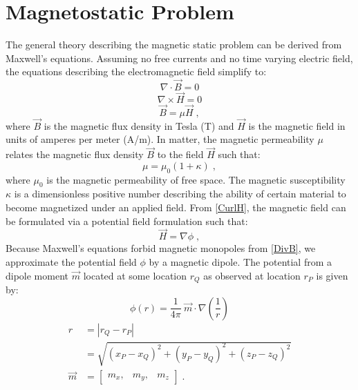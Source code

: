 
\chapter{Magnetostatic Problem}
\label{ch:Chap2_Forward}

The general theory describing the magnetic static problem can be derived from Maxwell's equations.
Assuming no free currents and no time varying electric field, the equations describing the electromagnetic field simplify to:
\begin{equation} \label{DivB}
	\nabla \cdot \vec{B} = 0 
\end{equation}
\begin{equation} \label{CurlH}
	\nabla \times \vec{H} = 0 
\end{equation}
\begin{equation}
	\vec{B} = \mu \vec{H} \;,
\end{equation}
where $\vec{B}$ is the magnetic flux density in Tesla (T) and $\vec{H}$ is the magnetic field in units of amperes per meter (A/m).
In matter, the magnetic permeability $\mu$ relates the magnetic flux density $\vec{B}$ to the field $\vec{H}$ such that:
 \begin{equation}
	\mu = \mu_0 (1+\kappa) \;,
\end{equation}
where $\mu_0$ is the magnetic permeability of free space. The magnetic susceptibility $\kappa$ is a dimensionless positive number describing the ability of certain material to become magnetized under an applied field. 
From \ref{CurlH}, the magnetic field can be formulated via a potential field formulation such that:
\begin{equation}
	 \vec{H} = \nabla \phi \;,
\end{equation}
Because Maxwell's equations forbid magnetic monopoles from \ref{DivB}, we approximate the potential field $\phi$ by a magnetic dipole. 
The potential from a dipole moment $\vec m$ located at some location $r_Q$ as observed at location $r_P$ is given by:
\begin{equation}
\phi(r) = \frac{1}{4\pi}\: \vec m \cdot \nabla \left( { \frac{1}{r} } \right) 
\end{equation}
\begin{equation*}
 \begin{split} 
 	 r &= |r_Q - r_P| \\
	  &= \sqrt{ (x_P - x_Q)^2 + (y_P - y_Q)^2 + (z_P - z_Q)^2 } \\
	 \vec m & = \begin{bmatrix} m_x, & m_y,& m_z \end{bmatrix}\;.
\end{split}
 \end{equation*}
